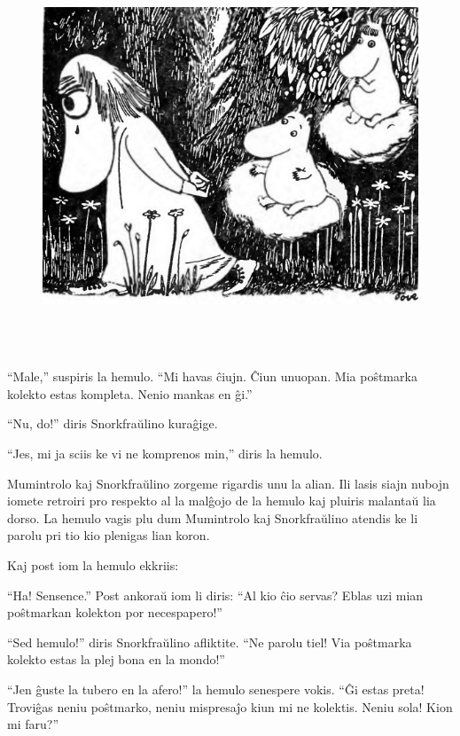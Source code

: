 \begin{figure}[htbp]
\centering
\includegraphics[width=420pt,height=332pt]{_5.jpg}
\caption{}
\label{_5}
\end{figure}

``Male,'' suspiris la hemulo. ``Mi havas ĉiujn. Ĉiun unuopan. Mia poŝtmarka kolekto estas kompleta. Nenio mankas en ĝi.''

``Nu, do!'' diris Snorkfraŭlino kuraĝige.

``Jes, mi ja sciis ke vi ne komprenos min,'' diris la hemulo.

Mumintrolo kaj Snorkfraŭlino zorgeme rigardis unu la alian. Ili lasis siajn nubojn iomete retroiri pro respekto al la malĝojo de la hemulo kaj pluiris malantaŭ lia dorso. La hemulo vagis plu dum Mumintrolo kaj Snorkfraŭlino atendis ke li parolu pri tio kio plenigas lian koron.

Kaj post iom la hemulo ekkriis:

``Ha! Sensence.'' Post ankoraŭ iom li diris: ``Al kio ĉio servas? Eblas uzi mian poŝtmarkan kolekton por necespapero!''

``Sed hemulo!'' diris Snorkfraŭlino afliktite. ``Ne parolu tiel! Via poŝtmarka kolekto estas la plej bona en la mondo!''

``Jen ĝuste la tubero en la afero!'' la hemulo senespere vokis. ``Ĝi estas preta! Troviĝas neniu poŝtmarko, neniu mispresaĵo kiun mi ne kolektis. Neniu sola! Kion mi faru?''

